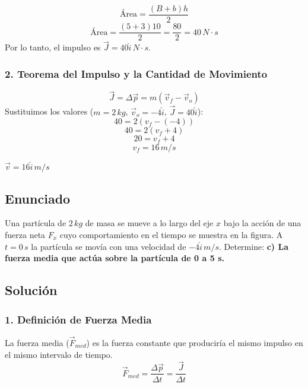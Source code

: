 \documentclass[12pt, a4paper]{article}
\begin{document}
$$ \text{Área} = \frac{(B + b)h}{2} $$
$$ \text{Área} = \frac{(5 + 3)10}{2} = \frac{80}{2} = 40 \, \si{N \cdot s} $$
Por lo tanto, el impulso es $\vec{J} = 40 \hat{i} \, \si{N \cdot s}$.

\subsubsection*{2. Teorema del Impulso y la Cantidad de Movimiento}
$$ \vec{J} = \Delta \vec{p} = m(\vec{v}_f - \vec{v}_o) $$
Sustituimos los valores ($m=2 \, \si{kg}$, $\vec{v}_o = -4 \hat{i}$, $\vec{J} = 40 \hat{i}$):
$$ 40 = 2 (v_f - (-4)) $$
$$ 40 = 2 (v_f + 4) $$
$$ 20 = v_f + 4 $$
$$ v_f = 16 \, \si{m/s} $$

\begin{tcolorbox}[colback=green!5!white, colframe=green!50!black, title=Respuesta Final]
\centering \Large $\vec{v} = 16 \hat{i} \, \si{m/s}$
\end{tcolorbox}

\newpage

\subsection*{Enunciado}
Una partícula de $2 \, \si{kg}$ de masa se mueve a lo largo del eje $x$ bajo la acción de una fuerza neta $F_x$ cuyo comportamiento en el tiempo se muestra en la figura. A $t=0 \, \si{s}$ la partícula se movía con una velocidad de $-4 \hat{i} \, \si{m/s}$. 
Determine: \textbf{c) La fuerza media que actúa sobre la partícula de 0 a 5 s.}

\begin{center}
\end{center}

\subsection*{Solución}

\subsubsection*{1. Definición de Fuerza Media}
La fuerza media ($\vec{F}_{med}$) es la fuerza constante que produciría el mismo impulso en el mismo intervalo de tiempo.
$$ \vec{F}_{med} = \frac{\Delta \vec{p}}{\Delta t} = \frac{\vec{J}}{\Delta t} $$
\end{document}
